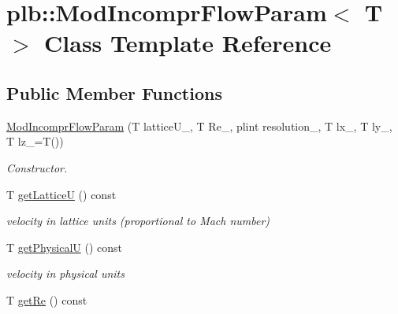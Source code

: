 \hypertarget{classplb_1_1ModIncomprFlowParam}{
\section{plb::ModIncomprFlowParam$<$ T $>$ Class Template Reference}
\label{classplb_1_1ModIncomprFlowParam}
}
\subsection*{Public Member Functions}
\begin{DoxyCompactItemize}
\item 
\hyperlink{classplb_1_1ModIncomprFlowParam_aa4270bb7a7a771f7b34ed7849857ba69}{ModIncomprFlowParam} (T latticeU\_\-, T Re\_\-, plint resolution\_\-, T lx\_\-, T ly\_\-, T lz\_\-=T())
\begin{DoxyCompactList}\small\item\em Constructor. \item\end{DoxyCompactList}\item 
\hypertarget{classplb_1_1ModIncomprFlowParam_a934f8dea9c6235f3b3890057b935a61a}{
T \hyperlink{classplb_1_1ModIncomprFlowParam_a934f8dea9c6235f3b3890057b935a61a}{getLatticeU} () const }
\label{classplb_1_1ModIncomprFlowParam_a934f8dea9c6235f3b3890057b935a61a}

\begin{DoxyCompactList}\small\item\em velocity in lattice units (proportional to Mach number) \item\end{DoxyCompactList}\item 
\hypertarget{classplb_1_1ModIncomprFlowParam_ad63c693f7d4b665d8089c86d1cb12d9c}{
T \hyperlink{classplb_1_1ModIncomprFlowParam_ad63c693f7d4b665d8089c86d1cb12d9c}{getPhysicalU} () const }
\label{classplb_1_1ModIncomprFlowParam_ad63c693f7d4b665d8089c86d1cb12d9c}

\begin{DoxyCompactList}\small\item\em velocity in physical units \item\end{DoxyCompactList}\item 
\hypertarget{classplb_1_1ModIncomprFlowParam_a08ca6b7c2fe3505ee71889458359dfbd}{
T \hyperlink{classplb_1_1ModIncomprFlowParam_a08ca6b7c2fe3505ee71889458359dfbd}{getRe} () const }
\label{classplb_1_1ModIncomprFlowParam_a08ca6b7c2fe3505ee71889458359dfbd}


\end{DoxyCompactItemize}
